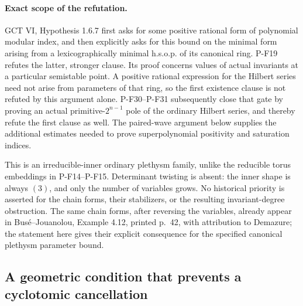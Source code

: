 \paragraph{Exact scope of the refutation.}
GCT VI, Hypothesis 1.6.7 first asks for some positive rational
form of polynomial modular index, and then explicitly asks for
this bound on the minimal form arising from a lexicographically
minimal h.s.o.p. of its canonical ring. P-F19 refutes the latter,
stronger clause. Its proof concerns values of actual invariants
at a particular semistable point. A positive rational expression
for the Hilbert series need not arise from parameters of that
ring, so the first existence clause is not refuted by this
argument alone. P-F30--P-F31 subsequently close that gate by proving
an actual primitive-$2^{n-1}$ pole of the ordinary Hilbert series,
and thereby refute the first clause as well. The paired-wave argument below supplies the additional
estimates needed to prove superpolynomial positivity and saturation indices.

This is an irreducible-inner ordinary plethysm family, unlike
the reducible torus embeddings in P-F14--P-F15. Determinant
twisting is absent: the inner shape is always $(3)$, and only
the number of variables grows. No historical
priority is asserted for the chain forms, their stabilizers,
or the resulting invariant-degree obstruction. The same chain
forms, after reversing the variables, already appear in
Bus\'e--Jouanolou, Example 4.12, printed p.~42, with attribution
to Demazure; the statement here gives their explicit consequence
for the specified canonical plethysm parameter bound.



\subsection{A geometric condition that prevents a cyclotomic cancellation}

